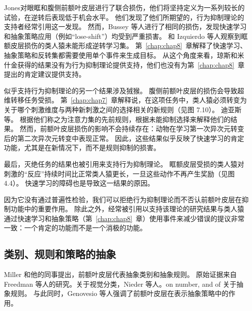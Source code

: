 Jones\cite{jones1972limbic}对眼眶和腹侧前额叶皮层进行了联合损伤，他们将坚持定义为一系列较长的试验，在逆转后表现低于机会水平。
他们发现了他们所期望的，行为抑制理论的支持者经常引用这一发现。
然而，Bussey 等人\cite{bussey2001role}进行了相同的损伤，发现快速学习和抽象策略应用（例如“lose-shift”）均受到严重损害。
和 Izquierdo 等人\cite{izquierdo2004bilateral}观察到眶额皮层损伤的类人猿未能形成逆转学习集。
第~\ref{chap:chap8}~章解释了快速学习、抽象策略和反转集都需要使用单个事件来生成目标。
从这个角度来看，琼斯和米什金获得的结果没有为行为抑制理论提供支持，他们也没有为第~\ref{chap:chap8}~章提出的肯定建议提供支持。
\par


似乎支持行为抑制理论的另一个结果涉及狨猴。
腹侧前额叶皮层的损伤会导致超维转移任务受损\cite{dias1996primate}。
第~\ref{chap:chap7}~章解释说，在这项任务中，类人猿必须转变为关于哪个刺激维度与两种新刺激之间的选择相关的新规则（见图 7.10）。
迪亚斯等。 根据他们称之为注意力集的先前规则，根据未能抑制选择来解释他们的结果。
然而，前额叶皮层损伤的影响不会持续存在：动物在学习第一次异次元转变后的第二次异次元转变中表现正常\cite{dias1997dissociable}。
因此，这些结果似乎反映了快速学习的肯定功能，尤其是在新情况下，而不是规则抑制的损害。
\par


最后，灭绝任务的结果也被引用来支持行为抑制理论\cite{butters1969retention}。
眶额皮层受损的类人猿对刺激的“反应”持续时间比正常类人猿更长，一旦这些动作不再产生奖励（见图 4.4）。 
快速学习的障碍也是导致这一结果的原因。
\par


因为它没有通过普遍性检验，我们可以拒绝行为抑制理论而不否认前额叶皮层在抑制功能中的重要作用。
除此之外，经常被引用以支持该理论的研究结果与类人猿通过快速学习和抽象策略（第~\ref{chap:chap8}~章）使用事件来减少错误的提议非常一致：一个肯定的功能而不是一个消极的功能。



\subsection{类别、规则和策略的抽象}

Miller 和他的同事提出，前额叶皮层代表抽象类别\cite{miller2003neural,roy2010prefrontal}和抽象规则\cite{miller2007rules}。
原始证据来自 Freedman 等人的研究\cite{freedman2002visual}。关于视觉分类，Nieder 等人\cite{nieder2002representation}。on number, and of \cite{white1999rule,wallis2001single}关于抽象规则。
与此同时，Genovesio 等人\cite{genovesio2005prefrontal}强调了前额叶皮层在表示抽象策略中的作用。
\par


